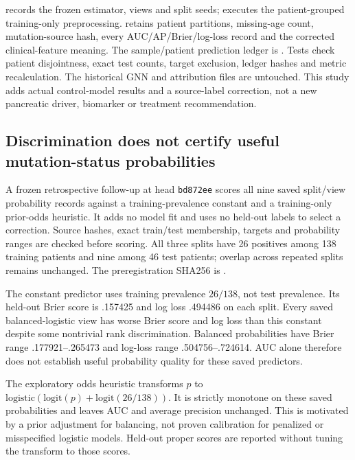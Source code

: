  records the frozen estimator, views and split seeds;  executes the patient-grouped training-only preprocessing.  retains patient partitions, missing-age count, mutation-source hash, every AUC/AP/Brier/log-loss record and the corrected clinical-feature meaning. The sample/patient prediction ledger is . Tests check patient disjointness, exact test counts, target exclusion, ledger hashes and metric recalculation. The historical GNN and attribution files are untouched. This study adds actual control-model results and a source-label correction, not a new pancreatic driver, biomarker or treatment recommendation.

\subsection{Discrimination does not certify useful mutation-status probabilities}
A frozen retrospective follow-up at head \texttt{bd872ee} scores all nine saved split/view probability records against a training-prevalence constant and a training-only prior-odds heuristic. It adds no model fit and uses no held-out labels to select a correction. Source hashes, exact train/test membership, targets and probability ranges are checked before scoring. All three splits have 26 positives among 138 training patients and nine among 46 test patients; overlap across repeated splits remains unchanged. The preregistration SHA256 is .

The constant predictor uses training prevalence $26/138$, not test prevalence. Its held-out Brier score is .157425 and log loss .494486 on each split. Every saved balanced-logistic view has worse Brier score and log loss than this constant despite some nontrivial rank discrimination. Balanced probabilities have Brier range .177921--.265473 and log-loss range .504756--.724614. AUC alone therefore does not establish useful probability quality for these saved predictors.

The exploratory odds heuristic transforms $p$ to $\mathrm{logistic}(\mathrm{logit}(p)+\mathrm{logit}(26/138))$. It is strictly monotone on these saved probabilities and leaves AUC and average precision unchanged. This is motivated by a prior adjustment for balancing, not proven calibration for penalized or misspecified logistic models. Held-out proper scores are reported without tuning the transform to those scores.

